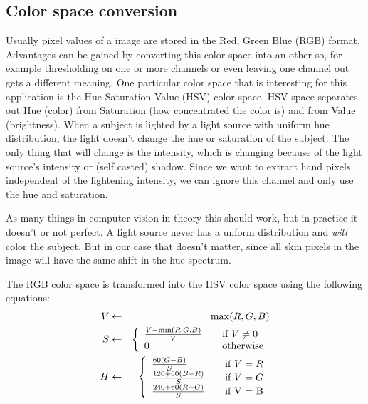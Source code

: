 \subsection*{Color space conversion}
Usually pixel values of a image are stored in the Red, Green Blue (RGB) format. Advantages can be gained by converting this color space into an other so, for example thresholding on one or more channels or even leaving one channel out gets a different meaning. One particular color space that is interesting for this application is the Hue Saturation Value (HSV) color space. HSV space separates out Hue (color) from Saturation (how concentrated the color is) and from Value (brightness). When a subject is lighted by a light source with uniform hue distribution, the light doesn't change the hue or saturation of the subject. The only thing that will change is the intensity, which is changing because of the light source's intensity or (self casted) shadow. Since we want to extract hand pixels independent of the lightening intensity, we can ignore this channel and only use the hue and saturation.

As many things in computer vision in theory this should work, but in practice it doesn't or not perfect. A light source never has a unform distribution and \emph{will} color the subject. But in our case that doesn't matter, since all skin pixels in the image will have the same shift in the hue spectrum.

The RGB color space is transformed into the HSV color space using the following equations:
\begin{eqnarray*}
  V & \leftarrow & \max(R,G,B) \\
  S & \leftarrow & \left\{
  \begin{array}{l l}
    \frac{V-\min(R, G, B)}{V} & \quad \text{if $V \neq 0$} \\
    0 						  & \quad \text{otherwise} \\
  \end{array} \right.\\
  H & \leftarrow & \left\{
  \begin{array}{l l}
    \frac{60(G - B)}{S}     & \quad \text{if $V = R$} \\
    \frac{120 + 60(B-R)}{S} & \quad \text{if $V = G$} \\
    \frac{240 + 60(R-G)}{S} & \quad \text{if V = B} \\
  \end{array} \right.\\
\end{eqnarray*}

